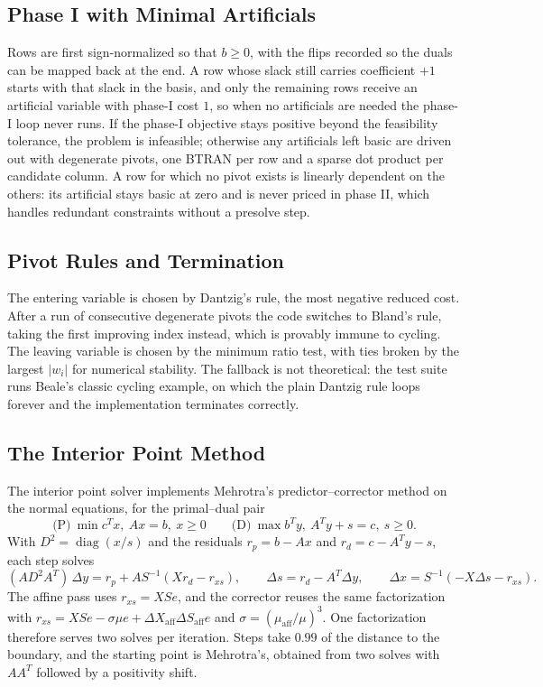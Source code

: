 \documentclass[12pt, a4paper]{article}
\begin{document}
\subsection{Phase I with Minimal Artificials}
Rows are first sign-normalized so that $b \ge 0$, with the flips recorded so the duals can be mapped back at the end. A row whose slack still carries coefficient $+1$ starts with that slack in the basis, and only the remaining rows receive an artificial variable with phase-I cost $1$, so when no artificials are needed the phase-I loop never runs. If the phase-I objective stays positive beyond the feasibility tolerance, the problem is infeasible; otherwise any artificials left basic are driven out with degenerate pivots, one BTRAN per row and a sparse dot product per candidate column. A row for which no pivot exists is linearly dependent on the others: its artificial stays basic at zero and is never priced in phase II, which handles redundant constraints without a presolve step.

\subsection{Pivot Rules and Termination}
The entering variable is chosen by Dantzig's rule, the most negative reduced cost. After a run of  consecutive degenerate pivots the code switches to Bland's rule, taking the first improving index instead, which is provably immune to cycling. The leaving variable is chosen by the minimum ratio test, with ties broken by the largest $|w_i|$ for numerical stability. The fallback is not theoretical: the test suite runs Beale's classic cycling example, on which the plain Dantzig rule loops forever and the implementation terminates correctly.

\subsection{The Interior Point Method}
The interior point solver implements Mehrotra's predictor--corrector method on the normal equations, for the primal--dual pair
\[
    \text{(P)}\ \min c^{T}x,\ Ax = b,\ x \ge 0
    \qquad
    \text{(D)}\ \max b^{T}y,\ A^{T}y + s = c,\ s \ge 0 .
\]
With $D^{2} = \operatorname{diag}(x/s)$ and the residuals $r_p = b - Ax$ and $r_d = c - A^{T}y - s$, each step solves
\[
    (A D^{2} A^{T})\,\Delta y = r_p + A S^{-1}(X r_d - r_{xs}), \qquad
    \Delta s = r_d - A^{T}\Delta y, \qquad
    \Delta x = S^{-1}(-X\Delta s - r_{xs}).
\]
The affine pass uses $r_{xs} = XSe$, and the corrector reuses the same factorization with $r_{xs} = XSe - \sigma\mu e + \Delta X_{\text{aff}} \Delta S_{\text{aff}} e$ and $\sigma = (\mu_{\text{aff}}/\mu)^{3}$. One factorization therefore serves two solves per iteration. Steps take $0.99$ of the distance to the boundary, and the starting point is Mehrotra's, obtained from two solves with $AA^{T}$ followed by a positivity shift.
\end{document}
